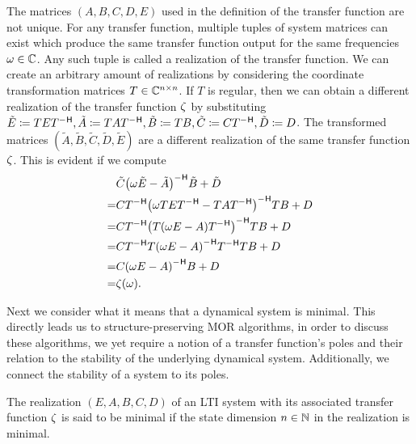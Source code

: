 \begin{remark}
    The matrices $(A, B, C, D, E)$ used in the definition of the transfer function are not unique.
    For any transfer function, multiple tuples of system matrices can exist which produce the same transfer function output for the same frequencies $\omega \in \mathbb{C}$.
    Any such tuple is called a realization of the transfer function.
    We can create an arbitrary amount of realizations by considering the coordinate transformation matrices $T \in \mathbb{C}^{n \times n}$.
    If $T$ is regular, then we can obtain a different realization of the transfer function $\zeta$ by substituting $\tilde{E} \coloneqq T E T\inv, \tilde{A} \coloneqq T A T\inv, \tilde{B} \coloneqq T B, \tilde{C} \coloneqq C T\inv, \tilde{D} \coloneqq D$.
    The transformed matrices $(\tilde{A}, \tilde{B}, \tilde{C}, \tilde{D}, \tilde{E})$ are a different realization of the same transfer function $\zeta$.
    This is evident if we compute
    \begin{align*}
        &\tilde{C} {\left( \omega \tilde{E} - \tilde{A} \right)}\inv \tilde{B} + \tilde{D} \\
        = &C T\inv {\left( \omega T E T\inv - T A T\inv \right)}\inv T B + D \\
        = &C T\inv {\left( T (\omega E - A) T\inv \right)}\inv T B + D \\
        = &C T\inv T {\left( \omega E - A \right)}\inv T\inv T B + D \\
        = &C {(\omega E - A)}\inv B + D \\
        = &\tfunc(\omega).
    \end{align*}
\end{remark}

Next we consider what it means that a dynamical system is minimal.
This directly leads us to structure-preserving \ac{MOR} algorithms, in order to discuss these algorithms, we yet require a notion of a transfer function's poles and their relation to the stability of the underlying dynamical system.
Additionally, we connect the stability of a system to its poles.

\begin{definition}\label{def:minimal-system}
    The realization $(E, A, B, C, D)$ of an \ac{LTI} system with its associated transfer function $\zeta$ is said to be minimal if the state dimension $n \in \mathbb{N}$ in the realization is minimal.
\end{definition}

